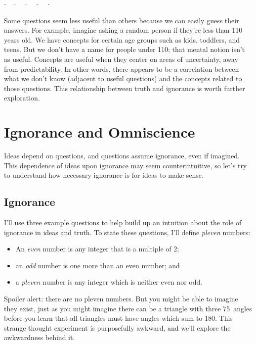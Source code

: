 \documentclass[11pt, oneside]{article}   	%
\newcommand{\dotq}{\cdot\quad}
\newcommand{\scenebreak}{
    \medskip\centerline{$\dotq\dotq\dotq\dotq\cdot$}\medskip
}
\begin{document}
\scenebreak

Some questions seem less useful than others because we can easily guess their
answers.
For example,
imagine asking a random person if they're
less than 110 years old.
We have concepts for certain age groups such as kids,
toddlers, and teens.
But we don't have a name for people under 110;
that mental notion isn't as useful.
Concepts are useful when they center on
areas of uncertainty, away from predictability.
In other words, there appears to be a correlation between
what we don't know (adjacent to useful questions) and the concepts
related to those questions.
This relationship between truth and ignorance is worth further exploration.

%
%
%
%
%


\section{Ignorance and Omniscience}

Ideas depend on questions,
and questions assume ignorance,
even if imagined.
This dependence of ideas upon ignorance
may seem counterintuitive, so
let's try to understand how necessary ignorance
is for ideas to make sense.

\subsection{Ignorance}

I'll use three example questions
to help build up an intuition about the role of
ignorance in ideas and truth.
To state these questions, I'll define
{\em pleven} numbers:
\begin{itemize}
    \item An {\em even} number is any integer that is a multiple of 2;
    \item an {\em odd} number is one more than an even number; and
    \item a {\em pleven} number is any integer which is neither even nor odd.
\end{itemize}
Spoiler
alert: there are no pleven numbers.
But you might be able to imagine they exist, just as you might imagine there can
be a triangle with three 75\degree\ angles before you learn that all triangles
must have angles which sum to 180\degree.
This strange thought experiment is purposefully awkward, and we'll
explore the awkwardness behind it.
\end{document}
